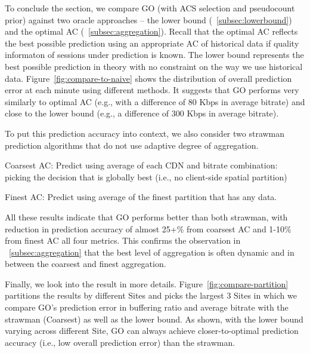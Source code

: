 \label{subsec:minieval}

To conclude the section, we compare GO (with ACS selection and pseudocount prior) against two oracle approaches -- the lower bound (\Section~\ref{subsec:lowerbound}) and the optimal AC (\Section~\ref{subsec:aggregation}).  Recall that the optimal AC reflects the best possible prediction using an appropriate AC of historical data if quality informaton of sessions under prediction is known. The lower bound represents the best possible prediction in theory with no constraint on the way we use historical data. Figure~\ref{fig:compare-to-naive} shows the distribution of overall prediction error at each minute using different methods. It suggests that GO performs very similarly to optimal AC (e.g., with a difference of 80 Kbps in average bitrate) and close to the lower bound (e.g., a difference of 300 Kbps in average bitrate). 

To put this prediction accuracy into context, we also consider two strawman prediction algorithms that do not use adaptive degree of aggregation.
\begin{packeditemize}
	\item Coarsest AC: Predict using average of each CDN and bitrate combination: picking the decision that is globally best (i.e., no client-side spatial partition)
	\item Finest AC: Predict using average of the finest partition that has any data.
\end{packeditemize}

All these results indicate that GO performs better than both strawman, with reduction in prediction accuracy of almost 25+\% from coarsest AC and 1-10\% from finest AC all four metrics. This confirms the observation in \Section~\ref{subsec:aggregation} that the best level of aggregation is often dynamic and in between the coarsest and finest aggregation.


Finally, we look into the result in more details. Figure~\ref{fig:compare-partition} partitions the results by different Sites and picks the largest 3 Sites in which we compare GO's prediction error in buffering ratio and average bitrate with the strawman (Coarsest) as well as the lower bound. As shown, with the lower bound varying across different Site, GO can always achieve closer-to-optimal prediction accuracy (i.e., low overall prediction error) than the strawman.

